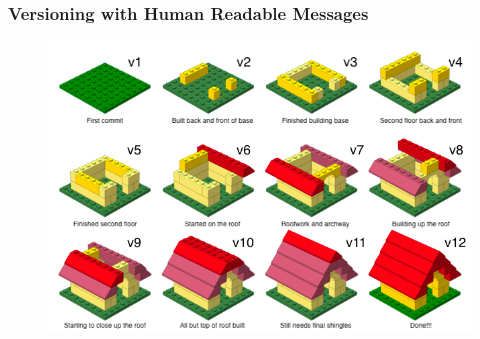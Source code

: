 \documentclass[11pt]{beamer}
\begin{document}

\begin{frame}
	
	
	\frametitle{\textbf{Versioning with Human Readable Messages}}
	
	\begin{figure}
		\centering
		\includegraphics[width=0.67\linewidth]{Images/S1/lego-steps-commit-messages}
	\end{figure}
	
\end{frame}

\end{document}
